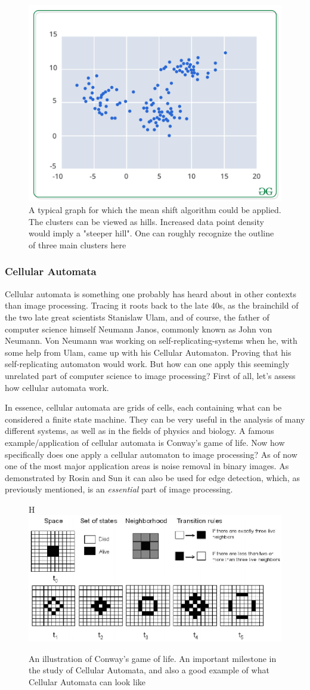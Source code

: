 \documentclass[twoside,a4paper,article]{combine}
\begin{document}
\begin{figure}[H]
    \centering
    \includegraphics[width=0.5\linewidth]{scattergraph.png}
    \caption{A typical graph for which the mean shift algorithm could be applied. The clusters can be viewed as hills. Increased data point density would imply a "steeper hill". One can roughly recognize the outline of three main clusters here}
    \label{fig:enter-label}
\end{figure}

\subsubsection{Cellular Automata}
Cellular automata is something one probably has heard about in other contexts than image processing. Tracing it roots back to the late 40s, as the brainchild of the two late great scientists Stanislaw Ulam, and of course, the father of computer science himself Neumann Janos, commonly known as John von Neumann. Von Neumann was working on self-replicating-systems when he, with some help from Ulam, came up with his Cellular Automaton. Proving that his self-replicating automaton would work. But how can one apply this seemingly unrelated part of computer science to image processing?  First of all, let's assess how cellular automata work.

In essence, cellular automata are grids of cells, each containing what can be considered a finite state machine. They can be very useful in the analysis of many different systems, as well as in the fields of physics and biology. A famous example/application of cellular automata is Conway's game of life\cite{gardnermathematical}.
Now how specifically does one apply a cellular automaton to image processing?  As of now one of the most major application areas is noise removal in binary images. \cite{inproceedings} As demonstrated by Rosin and Sun\cite{rosin} it can also be used for edge detection, which, as previously mentioned, is an \textit{essential} part of image processing.
\begin{figure}{H}
    \centering
    \includegraphics[width=0.5\linewidth]{gameoflife.png}
    \caption{An illustration of Conway's game of life. An important milestone in the study of Cellular Automata, and also a good example of what Cellular Automata can look like}
    \label{fig:enter-label}
\end{figure}
\end{document}
